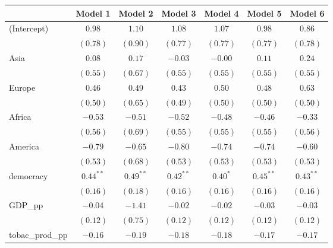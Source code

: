 
\begin{table}[!h]
\begin{center}
\begin{tabular}{l c c c c c c }
\toprule
 & Model 1 & Model 2 & Model 3 & Model 4 & Model 5 & Model 6 \\
\midrule
(Intercept)             & $0.98$       & $1.10$      & $1.08$       & $1.07$       & $0.98$       & $0.86$       \\
                        & $(0.78)$     & $(0.90)$    & $(0.77)$     & $(0.77)$     & $(0.77)$     & $(0.78)$     \\
Asia                    & $0.08$       & $0.17$      & $-0.03$      & $-0.00$      & $0.11$       & $0.24$       \\
                        & $(0.55)$     & $(0.67)$    & $(0.55)$     & $(0.55)$     & $(0.55)$     & $(0.55)$     \\
Europe                  & $0.46$       & $0.49$      & $0.43$       & $0.50$       & $0.48$       & $0.63$       \\
                        & $(0.50)$     & $(0.65)$    & $(0.49)$     & $(0.50)$     & $(0.50)$     & $(0.50)$     \\
Africa                  & $-0.53$      & $-0.51$     & $-0.52$      & $-0.48$      & $-0.46$      & $-0.33$      \\
                        & $(0.56)$     & $(0.69)$    & $(0.55)$     & $(0.55)$     & $(0.55)$     & $(0.56)$     \\
America                 & $-0.79$      & $-0.65$     & $-0.80$      & $-0.74$      & $-0.74$      & $-0.60$      \\
                        & $(0.53)$     & $(0.68)$    & $(0.53)$     & $(0.53)$     & $(0.53)$     & $(0.53)$     \\
democracy               & $0.44^{**}$  & $0.49^{**}$ & $0.42^{**}$  & $0.40^{*}$   & $0.45^{**}$  & $0.43^{**}$  \\
                        & $(0.16)$     & $(0.18)$    & $(0.16)$     & $(0.16)$     & $(0.16)$     & $(0.16)$     \\
GDP\_pp                 & $-0.04$      & $-1.41$     & $-0.02$      & $-0.02$      & $-0.03$      & $-0.03$      \\
                        & $(0.12)$     & $(0.75)$    & $(0.12)$     & $(0.12)$     & $(0.12)$     & $(0.12)$     \\
tobac\_prod\_pp         & $-0.16$      & $-0.19$     & $-0.18$      & $-0.18$      & $-0.17$      & $-0.17$      \\

\end{tabular}
\end{center}
\end{table}
